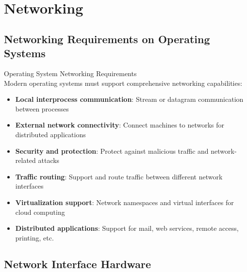 \section{Networking}

\subsection{Networking Requirements on Operating Systems}

\begin{concept}{Operating System Networking Requirements}\\
    Modern operating systems must support comprehensive networking capabilities:
    \begin{itemize}
        \item \textbf{Local interprocess communication}: Stream or datagram communication between processes
        \item \textbf{External network connectivity}: Connect machines to networks for distributed applications
        \item \textbf{Security and protection}: Protect against malicious traffic and network-related attacks
        \item \textbf{Traffic routing}: Support and route traffic between different network interfaces
        \item \textbf{Virtualization support}: Network namespaces and virtual interfaces for cloud computing
        \item \textbf{Distributed applications}: Support for mail, web services, remote access, printing, etc.
    \end{itemize}
\end{concept}

\subsection{Network Interface Hardware}


